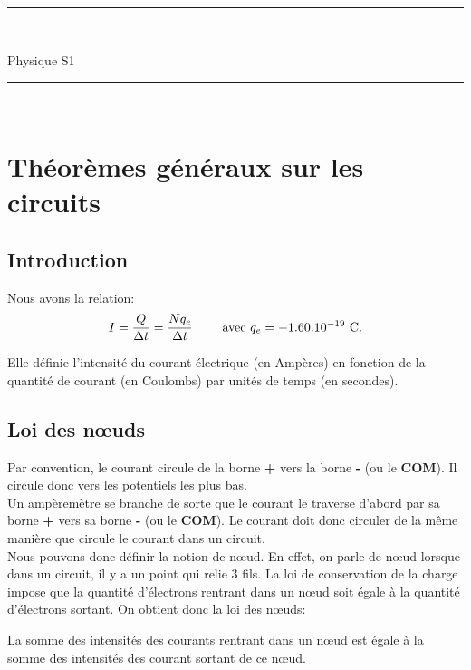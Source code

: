 \documentclass[11pt,a4paper,openany]{book}
\title{}
\author{Serrurot Gabin\\
BTS SNIR}
\date{\today}
\begin{document}
\sloppy

\begin{minipage}{0.9\linewidth}
\rule{\linewidth}{0.5mm}\\[0.2cm]
\huge\bfseries
\begin{center}
Physique S1
\end{center}
\rule{\linewidth}{0.5mm}\\[0.2cm]
\maketitle
\end{minipage}

\newpage

\tableofcontents

\newpage

\chapter{Théorèmes généraux sur les circuits}

\section{Introduction}

Nous avons la relation:
\begin{equation}
I = \frac{Q}{\Delta t} = \frac{Nq_{e}}{\Delta t} \text{\hspace{20px} avec $q_{e} = -1.60.10^{-19}$ C.}
\end{equation}

Elle définie l'intensité du courant électrique (en Ampères) en fonction de la quantité de courant (en Coulombs) par unités de temps (en secondes).

\section{Loi des nœuds}

Par convention, le courant circule de la borne \textbf{+} vers la borne \textbf{-} (ou le \textbf{COM}). Il circule donc vers les potentiels les plus bas.\\
Un ampèremètre se branche de sorte que le courant le traverse d'abord par sa borne \textbf{+} vers sa borne \textbf{-} (ou le \textbf{COM}). Le courant doit donc circuler de la même manière que circule le courant dans un circuit.\\
Nous pouvons donc définir la notion de nœud. En effet, on parle de nœud lorsque dans un circuit, il y a un point qui relie 3 fils. La loi de conservation de la charge impose que la quantité d'électrons rentrant dans un nœud soit égale à la quantité d'électrons sortant. On obtient donc la loi des nœuds:
\begin{Definition}
La somme des intensités des courants rentrant dans un nœud est égale à la somme des intensités des courant sortant de ce nœud.
\end{Definition} 
\end{document}
